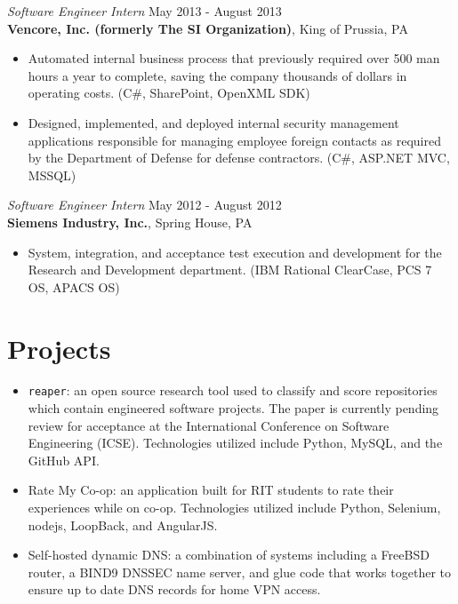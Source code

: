 \documentclass[margin]{res}
\begin{document}
\begin{resume}
{\sl Software Engineer Intern} \hfill May 2013 - August 2013 \\
\textbf{Vencore, Inc. (formerly The SI Organization)}, King of Prussia, PA
\begin{itemize} 
    \item[] Automated internal business process that previously required over
          500 man hours a year to complete, saving the company thousands of
          dollars in operating costs.
          (C\#, SharePoint, OpenXML SDK)
    \item[] Designed, implemented, and deployed internal security management
          applications responsible for managing employee foreign contacts as
          required by the Department of Defense for defense contractors.
          (C\#, ASP.NET MVC, MSSQL)
\end{itemize} 

{\sl Software Engineer Intern} \hfill May 2012 - August 2012 \\
\textbf{Siemens Industry, Inc.}, Spring House, PA
\begin{itemize}
    \item[] System, integration, and acceptance test execution and development
          for the Research and Development department.
          (IBM Rational ClearCase, PCS 7 OS, APACS OS)
\end{itemize} 

\section{Projects}

\begin{itemize}
    \item \texttt{reaper}: an open source research tool used to classify and
          score repositories which contain engineered software projects. The
          paper is currently pending review for acceptance at the International
          Conference on Software Engineering (ICSE). Technologies utilized
          include Python, MySQL, and the GitHub API.
    \item Rate My Co-op: an application built for RIT students to rate
          their experiences while on co-op. Technologies utilized include
          Python, Selenium, nodejs, LoopBack, and AngularJS.
    \item Self-hosted dynamic DNS: a combination of systems including a FreeBSD
          router, a BIND9 DNSSEC name server, and glue code that works together
          to ensure up to date DNS records for home VPN access.
\end{itemize}

\end{resume}
\end{document}
